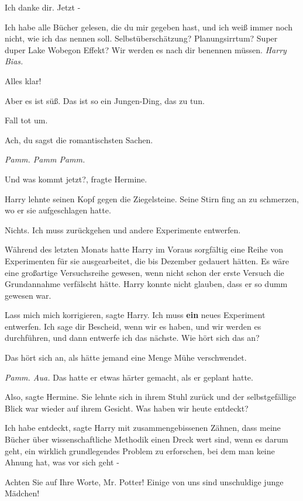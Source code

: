 \glqq Ich danke dir. Jetzt -\grqq{}

\glqq Ich habe alle Bücher gelesen, die du mir gegeben hast, und ich weiß immer
noch nicht, wie ich das nennen soll. Selbstüberschätzung? Planungsirrtum? Super
duper Lake Wobegon Effekt? Wir werden es nach dir benennen müssen. \emph{Harry
Bias.}\grqq{}

\glqq Alles klar!\grqq{}

\glqq Aber es ist süß. Das ist so ein Jungen-Ding, das zu tun.\grqq{}

\glqq Fall tot um.\grqq{}

\glqq Ach, du sagst die romantischsten Sachen.\grqq{}

\emph{Pamm. Pamm Pamm. }

\glqq Und was kommt jetzt?\grqq{}, fragte Hermine.

Harry lehnte seinen Kopf gegen die Ziegelsteine. Seine Stirn fing an zu
schmerzen, wo er sie aufgeschlagen hatte.

\glqq Nichts. Ich muss zurückgehen und andere Experimente entwerfen.\grqq{}

Während des letzten Monats hatte Harry im Voraus sorgfältig eine Reihe von
Experimenten für sie ausgearbeitet, die bis Dezember gedauert hätten. Es wäre
eine großartige Versuchsreihe gewesen, wenn nicht schon der erste Versuch die
Grundannahme verfälscht hätte. Harry konnte nicht glauben, dass er so dumm
gewesen war.

\glqq Lass mich mich korrigieren\grqq{}, sagte Harry. \glqq Ich muss
\textbf{ein} neues Experiment entwerfen. Ich sage dir Bescheid, wenn wir es
haben, und wir werden es durchführen, und dann entwerfe ich das nächste. Wie
hört sich das an?\grqq{}

\glqq Das hört sich an, als hätte jemand eine Menge Mühe verschwendet.\grqq{}

\emph{Pamm. Aua. } Das hatte er etwas härter gemacht, als er geplant hatte.

\glqq Also\grqq{}, sagte Hermine. Sie lehnte sich in ihrem Stuhl zurück und der
selbstgefällige Blick war wieder auf ihrem Gesicht. \glqq Was haben wir heute
entdeckt?\grqq{}

\glqq Ich habe entdeckt\grqq{}, sagte Harry mit zusammengebissenen Zähnen, \glqq
dass meine Bücher über wissenschaftliche Methodik einen Dreck wert sind, wenn es
darum geht, ein wirklich grundlegendes Problem zu erforschen, bei dem man keine
Ahnung hat, was vor sich geht -\grqq{}

\glqq Achten Sie auf Ihre Worte, Mr. Potter! Einige von uns sind unschuldige
junge Mädchen!\grqq{}

